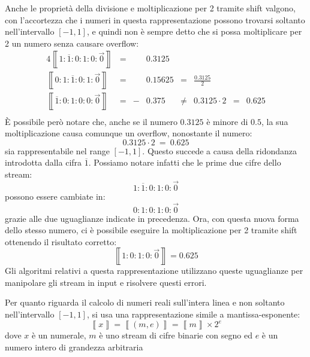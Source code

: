\documentclass[Lau]{sapthesis}
\begin{document}
Anche le proprietà della divisione e moltiplicazione per 2 tramite shift valgono, con l'accortezza che i numeri in questa rappresentazione possono trovarsi soltanto nell'intervallo $\left[-1,1\right]$, e quindi non è sempre detto che si possa moltiplicare per 2 un numero senza causare overflow:
\begin{alignat*}{4}
\left\llbracket1:\overline{1}:0:1:0:\overrightarrow{0}\right\rrbracket &{}={}& &0.3125\\
\left\llbracket0:1:\overline{1}:0:1:\overrightarrow{0}\right\rrbracket &{}={}& &0.15625 &{}={}& \frac{0.3125}{2}\\
\left\llbracket\overline{1}:0:1:0:0:\overrightarrow{0}\right\rrbracket &{}={}& -&0.375 &{}\neq{}& 0.3125 \cdot 2 &{}={}& 0.625\\
\end{alignat*}
È possibile però notare che, anche se il numero $0.3125$ è minore di $0.5$, la sua moltiplicazione causa comunque un overflow, nonostante il numero:
$$0.3125 \cdot 2\ =\ 0.625$$
sia rappresentabile nel range $\left[-1,1\right]$. Questo succede a causa della ridondanza introdotta dalla cifra $\overline{1}$. Possiamo notare infatti che le prime due cifre dello stream:
$$1:\overline{1}:0:1:0:\overrightarrow{0}$$
possono essere cambiate in:
$$0:1:0:1:0:\overrightarrow{0}$$
grazie alle due uguaglianze indicate in precedenza. Ora, con questa nuova forma dello stesso numero, ci è possibile eseguire la moltiplicazione per 2 tramite shift ottenendo il risultato corretto:
$$\left\llbracket1:0:1:0:\overrightarrow{0}\right\rrbracket = 0.625$$
Gli algoritmi relativi a questa rappresentazione utilizzano queste uguaglianze per manipolare gli stream in input e risolvere questi errori.

Per quanto riguarda il calcolo di numeri reali sull'intera linea e non soltanto nell'intervallo $\left[-1,1\right]$, si usa una rappresentazione simile a mantissa-esponente:
$$\left\llbracket x \right\rrbracket = \left\llbracket (m, e) \right\rrbracket = \left\llbracket m \right\rrbracket \times 2^e$$
dove $x$ è un numerale, $m$ è uno stream di cifre binarie con segno ed $e$ è un numero intero di grandezza arbitraria
\end{document}
